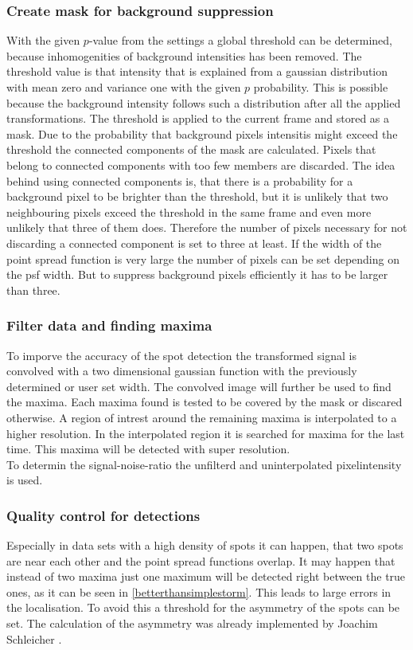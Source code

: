 \subsubsection{Create mask for background suppression}
With the given $p$-value from the settings a global threshold can be determined, because inhomogenities of background intensities has been removed. The threshold value is that intensity that is explained from a gaussian distribution with mean zero and variance one with the given $p$ probability. This is possible because the background intensity follows such a distribution after all the applied transformations.\newline
The threshold is applied to the current frame and stored as a mask. Due to the probability that background pixels intensitis might exceed the threshold the connected components of the mask are calculated. Pixels that belong to connected components with too few members are discarded. The idea behind using connected components is, that there is a probability for a background pixel to be brighter than the threshold, but it is unlikely that two neighbouring pixels exceed the threshold in the same frame and even more unlikely that three of them does. Therefore the number of pixels necessary for not discarding a connected component is set to three at least. If the width of the point spread function is very large the number of pixels can be set depending on the psf width. But to suppress background pixels efficiently it has to be larger than three.
\subsubsection{Filter data and finding maxima}
To imporve the accuracy of the spot detection the transformed signal is convolved with a two dimensional gaussian function with the previously determined or user set width. The convolved image will further be used to find the maxima. Each maxima found is tested to be covered by the mask or discared otherwise. A region of intrest around the remaining maxima is interpolated to a higher resolution. In the interpolated region  it is searched for maxima for the last time. This maxima will be detected with super resolution.\\
To determin the signal-noise-ratio the unfilterd and uninterpolated pixelintensity is used.

\subsubsection{Quality control for detections}
Especially in data sets with a high density of spots it can happen, that two spots are near each other and the point spread functions overlap. It may happen that instead of two maxima just one maximum will be detected right between the true ones, as it can be seen in \ref{betterthansimplestorm}. This leads to large errors in the localisation. To avoid this a threshold for the asymmetry of the spots can be set.\newline
The calculation of the asymmetry was already implemented by Joachim Schleicher \cite{MAJoachim}.



